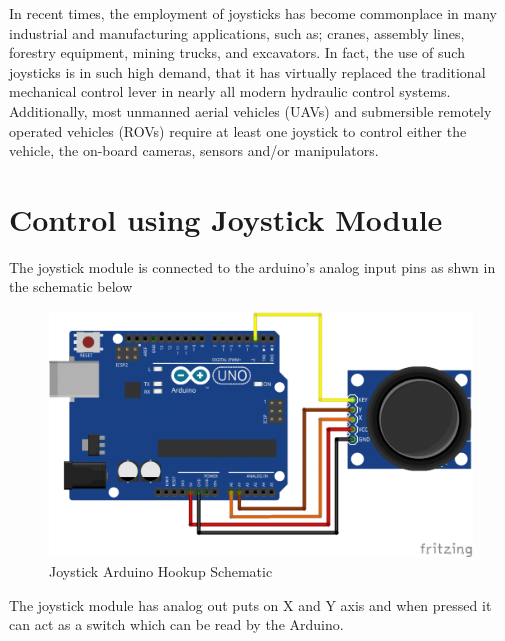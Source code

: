 \documentclass[MTech]{iitmdiss}
\begin{document}
In recent times, the employment of joysticks has become commonplace in many industrial and manufacturing applications, such as; cranes, assembly lines, forestry equipment, mining trucks, and excavators. In fact, the use of such joysticks is in such high demand, that it has virtually replaced the traditional mechanical control lever in nearly all modern hydraulic control systems. Additionally, most unmanned aerial vehicles (UAVs) and submersible remotely operated vehicles (ROVs) require at least one joystick to control either the vehicle, the on-board cameras, sensors and/or manipulators.


\section{Control using Joystick Module}

The joystick module is connected to the arduino’s analog input pins as shwn in the schematic below

	\begin{figure}[h]
		\includegraphics[width=\linewidth]{ffigures/joyschema}
		\centering
		\caption{Joystick Arduino Hookup Schematic}
		\label{fig:joysch}
	
	\end{figure}
	
The joystick module has analog out puts on X and Y axis and when pressed it can act as a switch which can be read by the Arduino.
\end{document}
